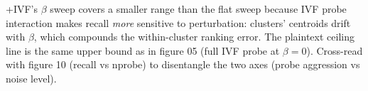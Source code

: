 \sap+IVF's $\beta$ sweep covers a smaller range than the flat \sap
sweep because IVF probe interaction makes recall \emph{more}
sensitive to perturbation: clusters' centroids drift with $\beta$,
which compounds the within-cluster ranking error. The plaintext
ceiling line is the same upper bound as in figure 05 (full IVF
probe at $\beta = 0$). Cross-read with figure 10 (recall vs
nprobe) to disentangle the two axes (probe aggression vs noise
level).
